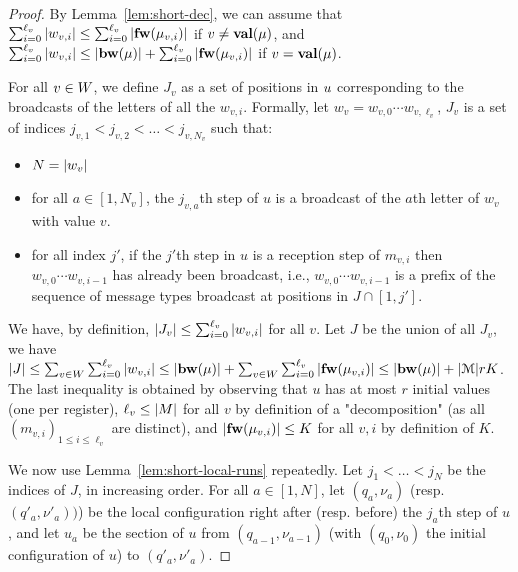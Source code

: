 \begin{proof}
	By Lemma~\ref{lem:short-dec}, we can assume that $\sum_{i=0}^{\ell_v} |w_{v,i}| \leq \sum_{i=0}^{\ell_v} |\mathbf{fw}(\mu_{v,i})|$ if $v \neq \mathbf{val}(\mu)$, and $\sum_{i=0}^{\ell_v} |w_{v,i}| \leq |\mathbf{bw}(\mu)| + \sum_{i=0}^{\ell_v} |\mathbf{fw}(\mu_{v,i})|$ if $v = \mathbf{val}(\mu)$.
	
	For all $v\in W$, we define $J_v$ as a set of positions in $u$ corresponding to the broadcasts of the letters of all the $w_{v,i}$. Formally, let $w_v = w_{v,0} \cdots w_{v,\ell_v}$, $J_v$ is a set of indices $j_{v,1} < j_{v,2} < \ldots < j_{v,N_v}$ such that: 
	\begin{itemize}
		\item $N = |w_v|$
		
		\item for all $a \in [1,N_v]$, the $j_{v,a}$th step of $u$ is a broadcast of the $a$th letter of $w_v$ with value $v$.
		
		\item for all index $j'$, if the $j'$th step in $u$ is a reception step of $m_{v, i}$ then $w_{v,0} \cdots w_{v,i-1}$ has already been broadcast, i.e., $w_{v,0} \cdots w_{v,i-1}$ is a prefix of the sequence of message types broadcast at positions in $J \cap [1, j']$.
	\end{itemize}

	We have, by definition, $|J_v| \leq \sum_{i=0}^{\ell_v} |w_{v,i}|$ for all $v$.
	Let $J$ be the union of all $J_v$, we have $|J| \leq \sum_{v \in W}\sum_{i=0}^{\ell_v} |w_{v,i}| \leq |\mathbf{bw}(\mu)| +  \sum_{v \in W}\sum_{i=0}^{\ell_v} |\mathbf{fw}(\mu_{v,i})|  \leq |\mathbf{bw}(\mu)|+ |\mathcal{M}|rK$. The last inequality is obtained by observing that $u$ has at most $r$ initial values (one per register), $\ell_v \leq |M|$ for all $v$ by definition of a "decomposition" (as all $(m_{v,i})_{1\leq i \leq \ell_v}$ are distinct), and $|\mathbf{fw}(\mu_{v,i})| \leq K$ for all $v,i$ by definition of $K$.
	
	We now use Lemma~\ref{lem:short-local-runs} repeatedly. Let $j_1< \ldots < j_N$ be the indices of $J$, in increasing order. For all $a \in [1,N]$, let $(q_a, \nu_a)$ (resp. $(q'_a, \nu'_a))$) be the local configuration right after (resp. before) the $j_a$th step of $u$, and let $u_a$ be the section of $u$ from $(q_{a-1}, \nu_{a-1})$ (with $(q_0, \nu_0)$ the initial configuration of $u$) to $(q'_a, \nu'_a)$.
	

\end{proof}
